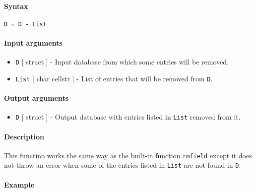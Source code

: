 


	\paragraph{Syntax}

\begin{verbatim}
D = D - List
\end{verbatim}

\paragraph{Input arguments}

\begin{itemize}
\item
  \texttt{D} {[} struct {]} - Input database from which some entries
  will be removed.
\item
  \texttt{List} {[} char \textbar{} cellstr {]} - List of entries that
  will be removed from \texttt{D}.
\end{itemize}

\paragraph{Output arguments}

\begin{itemize}
\itemsep1pt\parskip0pt
\item
  \texttt{D} {[} struct {]} - Output database with entries listed in
  \texttt{List} removed from it.
\end{itemize}

\paragraph{Description}

This functino works the same way as the built-in function
\texttt{rmfield} except it does not throw an error when some of the
entries listed in \texttt{List} are not found in \texttt{D}.

\paragraph{Example}


